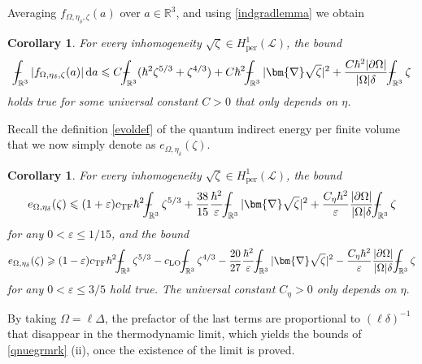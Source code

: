 \documentclass[final,onefignum,onetabnum,reqno]{amsart}
\newtheorem{corollary}[theorem]{Corollary}
\theoremstyle{remark}
\renewcommand{\le}{\leqslant}
\renewcommand{\ge}{\geqslant}
\renewcommand{\epsilon}{\varepsilon}
\newcommand{\RR}{\mathbb{R}}
\newcommand{\per}{\mathrm{per}} %
\newcommand{\TF}{\mathrm{TF}} %
\newcommand{\LO}{\mathrm{LO}} %
\newcommand{\grad}{\bm{\nabla}} %
\newcommand{\tetra}{\mathbb{\Delta}} %
\newcommand{\dd}{\mathrm{d}} %
\def\Xint#1{\mathchoice
{\XXint\displaystyle\textstyle{#1}}%
{\XXint\textstyle\scriptstyle{#1}}%
{\XXint\scriptstyle\scriptscriptstyle{#1}}%
{\XXint\scriptscriptstyle\scriptscriptstyle{#1}}%
\!\int}
\def\XXint#1#2#3{{\setbox0=\hbox{$#1{#2#3}{\int}$ }
\vcenter{\hbox{$#2#3$ }}\kern-.6\wd0}}
\def\dashint{\Xint-}
\newcommand{\LC}{\mathcal{L}}
\begin{document}
Averaging $f_{\Omega,\eta_\delta,\zeta}(a)$ over $a\in\RR^3$, and using \cref{indgradlemma} we obtain 
\begin{corollary}\label{fabsapriori}
For every inhomogeneity $\sqrt{\zeta}\in H_\per^1(\LC)$, the bound
$$
\dashint_{\RR^3} |f_{\Omega,\eta_\delta,\zeta}(a)|\,\dd a \le C \dashint_{\RR^3} (\hbar^2\zeta^{5/3} + \zeta^{4/3})
  + C\hbar^2 \dashint_{\RR^3}|\grad\sqrt{\zeta}|^2 + \frac{C\hbar^2|\partial\Omega|}{|\Omega|\delta}\dashint_{\RR^3}\zeta 
$$
holds true for some universal constant $C>0$ that only depends on $\eta$.
\end{corollary}

Recall the definition \cref{evoldef} of the quantum indirect energy per finite volume that we now simply denote as $e_{\Omega,\eta_\delta}(\zeta)$.

\begin{corollary}\label{aprioricoro}
For every inhomogeneity $\sqrt{\zeta}\in H_\per^1(\LC)$, the bound
$$
e_{\Omega,\eta_\delta}(\zeta) \le  (1+\epsilon) c_{\TF}\hbar^2 \dashint_{\RR^3}\zeta^{5/3}
+ \frac{38}{15}\frac{\hbar^2}{\epsilon} \dashint_{\RR^3}|\grad \sqrt{\zeta}|^2 + \frac{C_\eta\hbar^2}{\epsilon}\frac{|\partial\Omega|}{|\Omega|\delta}\dashint_{\RR^3}\zeta
$$
for any $0<\epsilon\le 1/15$, and the bound
$$
e_{\Omega,\eta_\delta}(\zeta) \ge (1-\epsilon)c_\TF\hbar^2\dashint_{\RR^3}\zeta^{5/3} -c_\LO\dashint_{\RR^3}\zeta^{4/3} - \frac{20}{27}\frac{\hbar^2}{\epsilon}\dashint_{\RR^3}|\grad \sqrt{\zeta}|^2-\frac{C_\eta\hbar^2}{\epsilon}\frac{|\partial\Omega|}{|\Omega|\delta}\dashint_{\RR^3}\zeta
$$
for any $0<\epsilon\le 3/5$ hold true. The universal constant $C_\eta>0$ only depends on $\eta$.
\end{corollary}

By taking $\Omega=\ell\tetra$, the prefactor of the last terms are proportional to $(\ell\delta)^{-1}$ that disappear in the thermodynamic limit, which yields the bounds of
\cref{qnuegrmrk} (ii), once the existence of the limit is proved. 


\end{document}
